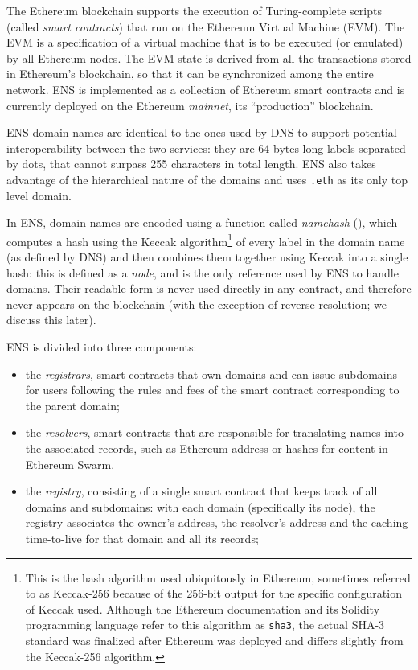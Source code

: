 \documentclass[mscthesis]{usiinfthesis}
\begin{document}
The Ethereum blockchain supports the execution of Turing-complete scripts (called \emph{smart contracts}) that run on the Ethereum Virtual Machine (EVM). The EVM is a specification of a virtual machine that is to be executed (or emulated) by all Ethereum nodes. The EVM state is derived from all the transactions stored in Ethereum's blockchain, so that it can be synchronized among the entire network. ENS is implemented as a collection of Ethereum smart contracts and is currently deployed on the Ethereum \textit{mainnet}, its ``production'' blockchain.

ENS domain names are identical to the ones used by DNS to support potential interoperability between the two services: they are 64-bytes long labels separated by dots, that cannot surpass 255 characters in total length. ENS also takes advantage of the hierarchical nature of the domains and uses \texttt{.eth} as its only top level domain.

In ENS, domain names are encoded using a function called \emph{namehash} (\cite{eip:137}), which computes a hash using the Keccak algorithm\footnote{This is the hash algorithm used ubiquitously in Ethereum, sometimes referred to as Keccak-256 because of the 256-bit output for the specific configuration of Keccak used. Although the Ethereum documentation and its Solidity programming language refer to this algorithm as \texttt{sha3}, the actual SHA-3 standard was finalized after Ethereum was deployed and differs slightly from the Keccak-256 algorithm.} \cite{} %
of every label in the domain name (as defined by DNS) and then combines them together using Keccak into a single hash: this is defined as a \emph{node}, and is the only reference used by ENS to handle domains. Their readable form is never used directly in any contract, and therefore never appears on the blockchain (with the exception of reverse resolution; we discuss this later).

ENS is divided into three components:
\begin{itemize}
	\item the \emph{registrars}, smart contracts that own domains and can issue subdomains for users following the rules and fees of the smart contract corresponding to the parent domain; 
	\item the \emph{resolvers}, smart contracts that are responsible for translating names into the associated records, such as Ethereum address or hashes for content in Ethereum Swarm. %
	\item the \emph{registry}, consisting of a single smart contract that keeps track of all domains and subdomains: with each domain (specifically its node), the registry associates the owner's address, the resolver's address and the caching time-to-live for that domain and all its records;
\end{itemize}
\end{document}
